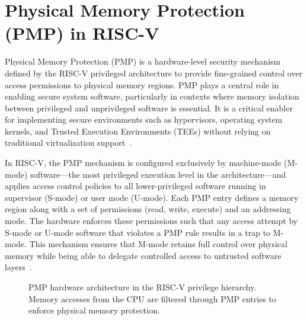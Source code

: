 \section{Physical Memory Protection (PMP) in RISC-V}
\label{sec:pmp}

Physical Memory Protection (PMP) is a hardware-level security mechanism defined by the RISC-V privileged architecture to provide fine-grained control over access permissions to physical memory regions. PMP plays a central role in enabling secure system software, particularly in contexts where memory isolation between privileged and unprivileged software is essential. It is a critical enabler for implementing secure environments such as hypervisors, operating system kernels, and Trusted Execution Environments (TEEs) without relying on traditional virtualization support~\cite{riscvprivspec}.

In RISC-V, the PMP mechanism is configured exclusively by machine-mode (M-mode) software—the most privileged execution level in the architecture—and applies access control policies to all lower-privileged software running in supervisor (S-mode) or user mode (U-mode). Each PMP entry defines a memory region along with a set of permissions (read, write, execute) and an addressing mode. The hardware enforces these permissions such that any access attempt by S-mode or U-mode software that violates a PMP rule results in a trap to M-mode. This mechanism ensures that M-mode retains full control over physical memory while being able to delegate controlled access to untrusted software layers~\cite{riscvprivspec,lee2019keystone}.


\begin{figure}[htbp]
\centering
{}
\caption{PMP hardware architecture in the RISC‑V privilege hierarchy. Memory accesses from the CPU are filtered through PMP entries to enforce physical memory protection.}
\label{fig:pmp-arch}
\end{figure}

